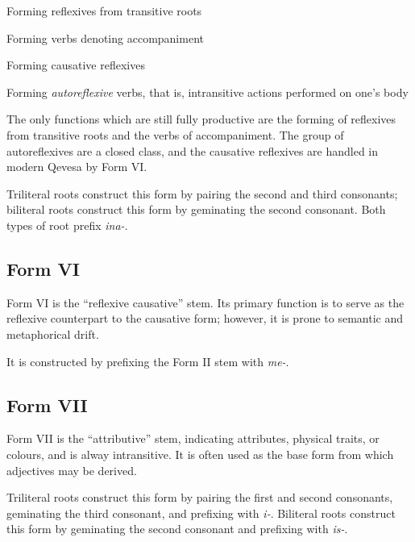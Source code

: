\documentclass[grammar]{subfiles}
\begin{document}
  \begin{itemize*}
  \item Forming reflexives from transitive roots
  \item Forming verbs denoting accompaniment
  \item Forming causative reflexives
  \item Forming \textit{autoreflexive} verbs, that is, intransitive actions performed on one’s body
  \end{itemize*}

  The only functions which are still fully productive are the forming of reflexives from transitive roots and the verbs of accompaniment. The group of autoreflexives are a closed class, and the causative reflexives are handled in modern Qevesa by Form VI.

  Triliteral roots construct this form by pairing the second and third consonants; biliteral roots construct this form by geminating the second consonant. Both types of root prefix \textit{ina-}.

  \subsection{Form VI}
  \label{ssec:dev_verb_form_vi}

  Form VI is the “reflexive causative” stem. Its primary function is to serve as the reflexive counterpart to the causative form; however, it is prone to semantic and metaphorical drift.

  It is constructed by prefixing the Form II stem with \textit{me-}. 


  \subsection{Form VII}
  \label{ssec:dev_verb_form_vii}

  Form VII is the “attributive” stem, indicating attributes, physical traits, or colours, and is alway intransitive. It is often used as the base form from which adjectives may be derived.

  Triliteral roots construct this form by pairing the first and second consonants, geminating the third consonant, and prefixing with \textit{i-}. Biliteral roots construct this form by geminating the second consonant and prefixing with \textit{is-}.
\end{document}
